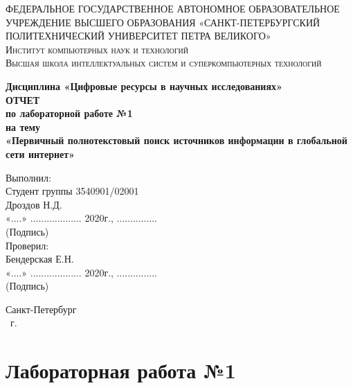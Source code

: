\documentclass[14pt,a4paper,report]{report}
\begin{document}
\def\contentsname{Содержание}

\begin{titlepage}
	\begin{center}
		\textsc{ФЕДЕРАЛЬНОЕ ГОСУДАРСТВЕННОЕ АВТОНОМНОЕ ОБРАЗОВАТЕЛЬНОЕ УЧРЕЖДЕНИЕ ВЫСШЕГО ОБРАЗОВАНИЯ
«САНКТ-ПЕТЕРБУРГСКИЙ ПОЛИТЕХНИЧЕСКИЙ УНИВЕРСИТЕТ ПЕТРА ВЕЛИКОГО»\\[5mm]
			Институт компьютерных наук и технологий\\
			Высшая школа интеллектуальных систем и суперкомпьютерных технологий}
		
		\vfill
		
		\textbf{Дисциплина «Цифровые ресурсы в научных исследованиях»\\[10mm]
		ОТЧЕТ\\[2mm]
		по лабораторной работе №1\\[2mm]
		на тему\\[2mm]
			«Первичный полнотекстовый поиск источников информации в глобальной сети интернет»\\[41mm]
		}
	\end{center}
	
	\hfill
	\begin{minipage}{.4\textwidth}
		Выполнил:\\[2mm] 
        Студент группы 3540901/02001\\
		Дроздов Н.Д.\\[2mm]
        «....» ................... 2020г., ...............\\
        \hspace*{38mm} (Подпись)\\[2mm]
		Проверил:\\[2mm] 
		Бендерская Е.Н.\\[2mm]
		«....» ................... 2020г., ...............\\
        \hspace*{38mm} (Подпись)\\
	\end{minipage}
	\vfill
	\begin{center}
		Санкт-Петербург\\ \the\year\ г.
	\end{center}
\end{titlepage}

\tableofcontents
\clearpage

\chapter{Лабораторная работа №1}
\end{document}
